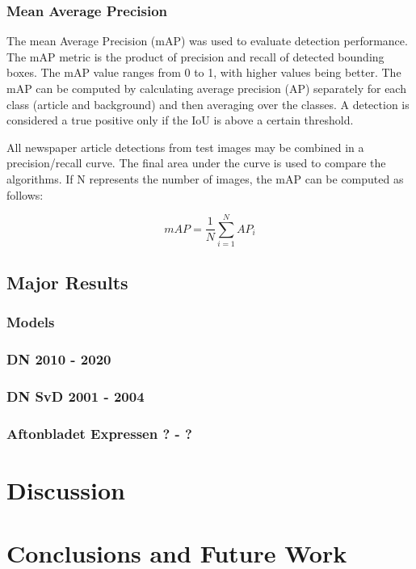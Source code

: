 \documentclass[english, bibtex]{kththesis}
\begin{document}
\subsection{Mean Average Precision}

The mean Average Precision (mAP) was used to evaluate detection performance. The mAP metric is the product of precision and recall of detected bounding boxes. The mAP value ranges from 0 to 1, with higher values being better. The mAP can be computed by calculating average precision (AP) separately for each class (article and background) and then averaging over the classes. A detection is considered a true positive only if the IoU is above a certain threshold. 

All newspaper article detections from test images may be combined in a precision/recall curve. The final area under the curve is used to compare the algorithms. If N represents the number of images, the mAP can be computed as follows:

\begin{equation}
mAP = \frac{1}{N} \sum_{i=1}^{N} AP_i
    \label{eqn:map}
\end{equation}

\section{Major Results}

\subsection{Models}

\subsection{DN 2010 - 2020}
\subsection{DN SvD 2001 - 2004}
\subsection{Aftonbladet Expressen ? - ?}


\chapter{Discussion}
\label{ch:disc}

\chapter{Conclusions and Future Work}
\end{document}
